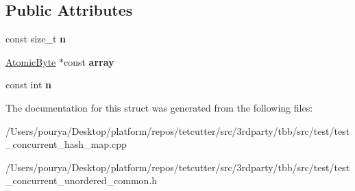 \subsection*{Public Attributes}
\begin{DoxyCompactItemize}
\item 
\hypertarget{structParallelTraverseBody_aa712d61941325fb6e63af312fcc84b81}{}const size\+\_\+t {\bfseries n}\label{structParallelTraverseBody_aa712d61941325fb6e63af312fcc84b81}

\item 
\hypertarget{structParallelTraverseBody_a5c61e7b04cb864e3fa28f0f35f1696fc}{}\hyperlink{structtbb_1_1atomic}{Atomic\+Byte} $\ast$const {\bfseries array}\label{structParallelTraverseBody_a5c61e7b04cb864e3fa28f0f35f1696fc}

\item 
\hypertarget{structParallelTraverseBody_a3794ec8e3c06fa5125793b16f640c348}{}const int {\bfseries n}\label{structParallelTraverseBody_a3794ec8e3c06fa5125793b16f640c348}

\end{DoxyCompactItemize}


The documentation for this struct was generated from the following files\+:\begin{DoxyCompactItemize}
\item 
/\+Users/pourya/\+Desktop/platform/repos/tetcutter/src/3rdparty/tbb/src/test/test\+\_\+concurrent\+\_\+hash\+\_\+map.\+cpp\item 
/\+Users/pourya/\+Desktop/platform/repos/tetcutter/src/3rdparty/tbb/src/test/test\+\_\+concurrent\+\_\+unordered\+\_\+common.\+h\end{DoxyCompactItemize}
